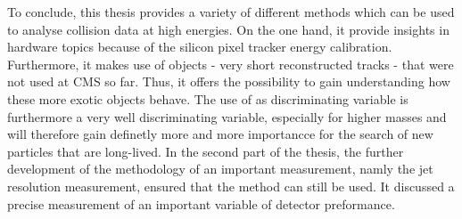 To conclude, this thesis provides a variety of different methods which can be used to analyse collision data at high energies.
On the one hand, it provide insights in hardware topics because of the silicon pixel tracker energy calibration.
Furthermore, it makes use of objects - very short reconstructed tracks - that were not used at CMS so far.
Thus, it offers the possibility to gain understanding how these more exotic objects behave.
The use of \dedx as discriminating variable is furthermore a very well discriminating variable, especially for higher masses and will therefore gain definetly more and more importancce for the search of new particles that are long-lived.
In the second part of the thesis, the further development of the methodology of an important measurement, namly the jet \pt resolution measurement, ensured that the method can still be used.
It discussed a precise measurement of an important variable of detector preformance.
 





